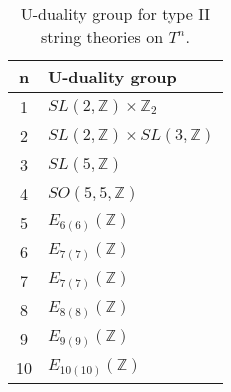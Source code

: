 \begin{table}\centering
    \caption{U-duality group for type II string theories on $T^n$.}\label{tab:UdualityString}
    \begin{tabular}{|c|l|}\hline
        n & U-duality group \\\hline
        1 & $SL(2,\mathbb{Z})\times\mathbb{Z}_2$\\
        2 & $SL(2,\mathbb{Z})\times SL(3,\mathbb{Z})$\\
        3 & $SL(5,\mathbb{Z})$\\
        4 & $SO(5,5,\mathbb{Z})$\\
        5 & $E_{6(6)}(\mathbb{Z})$\\
        6 & $E_{7(7)}(\mathbb{Z})$\\
        7 & $E_{7(7)}(\mathbb{Z})$\\
        8 & $E_{8(8)}(\mathbb{Z})$\\
        9 & $E_{9(9)}(\mathbb{Z})$\\
        10 &$E_{10(10)}(\mathbb{Z})$\\\hline
    \end{tabular}
\end{table}


